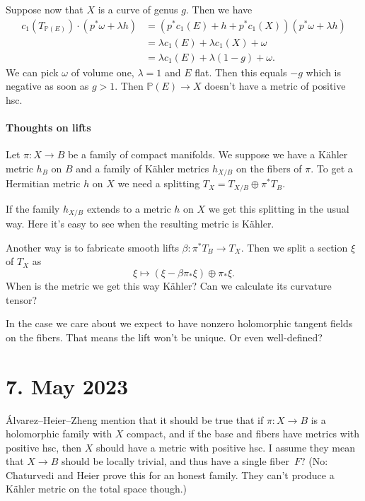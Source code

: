 \documentclass[11pt]{article}
\theoremstyle{definition}
\newcommand{\kk}[1]{\mathbb{#1}}
\begin{document}
Suppose now that $X$ is a curve of genus $g$. Then we have
\begin{align*}
c_1(T_{\kk P(E)}) \cdot (p^* \omega + \lambda h)
&= (p^*c_1(E) + h + p^* c_1(X))(p^* \omega + \lambda h)
\\
&= \lambda c_1(E) + \lambda c_1(X) + \omega
\\
&= \lambda c_1(E) + \lambda (1-g) + \omega.
\end{align*}
We can pick $\omega$ of volume one, $\lambda = 1$ and $E$ flat.
Then this equals $-g$ which is negative as soon as $g > 1$.
Then $\kk P(E) \to X$ doesn't have a metric of positive hsc.



\paragraph{Thoughts on lifts}

Let $\pi : X \to B$ be a family of compact manifolds.
We suppose we have a K\"ahler metric $h_B$ on $B$ and a family of K\"ahler
metrics $h_{X/B}$ on the fibers of $\pi$.
To get a Hermitian metric $h$ on $X$ we need a splitting $T_X = T_{X/B} \oplus
\pi^* T_B$.

If the family $h_{X/B}$ extends to a metric $h$ on $X$ we get this splitting in
the usual way.
Here it's easy to see when the resulting metric is K\"ahler.

Another way is to fabricate smooth lifts $\beta : \pi^*T_B \to T_X$.
Then we split a section $\xi$ of $T_X$ as
$$
\xi \mapsto (\xi - \beta \pi_* \xi) \oplus \pi_* \xi.
$$
When is the metric we get this way K\"ahler?
Can we calculate its curvature tensor?

In the case we care about we expect to have nonzero holomorphic tangent fields
on the fibers. That means the lift won't be unique.
Or even well-defined?


\section{7. May 2023}

\'Alvarez--Heier--Zheng mention that it should be true that if $\pi : X \to B$
is a holomorphic family with $X$ compact, and if the base and fibers have
metrics with positive hsc, then $X$ should have a metric with positive hsc.
I assume they mean that $X \to B$ should be locally trivial, and thus have a
single fiber~$F$?
(No: Chaturvedi and Heier prove this for an honest family.
They can't produce a K\"ahler metric on the total space though.)
\end{document}
